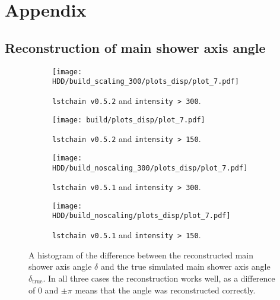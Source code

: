 \chapter{Appendix}

\section{Reconstruction of main shower axis angle}
\begin{figure}
    \centering
    \begin{subfigure}{0.49\textwidth}
        \centering
        \texttt{[image: HDD/build\_scaling\_300/plots\_disp/plot\_7.pdf]}
        \caption{\texttt{lstchain v0.5.2} and \texttt{intensity > 300}.}
    \end{subfigure}
    \hfill
    \begin{subfigure}{0.49\textwidth}
        \centering
        \texttt{[image: build/plots\_disp/plot\_7.pdf]}
        \caption{\texttt{lstchain v0.5.2} and \texttt{intensity > 150}.}
    \end{subfigure}
    \newline\vfill
    \begin{subfigure}{0.49\textwidth}
        \centering
        \texttt{[image: HDD/build\_noscaling\_300/plots\_disp/plot\_7.pdf]}
        \caption{\texttt{lstchain v0.5.1} and \texttt{intensity > 300}.}
    \end{subfigure}
    \hfill
    \begin{subfigure}{0.49\textwidth}
        \centering
        \texttt{[image: HDD/build\_noscaling/plots\_disp/plot\_7.pdf]}
        \caption{\texttt{lstchain v0.5.1} and \texttt{intensity > 150}.}
    \end{subfigure}
    \caption{A histogram of the difference between the reconstructed main shower axis angle $\delta$ and the true simulated main shower axis angle $\delta_\text{true}$.
        In all three cases the reconstruction works well, as a difference of $\num{0}$ and $\pm \pi$ means that the angle was reconstructed correctly.
    }
    \label{fig:delta_comparison}
\end{figure}



